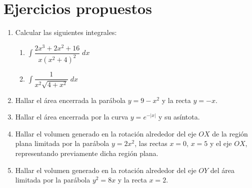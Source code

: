 \section{Ejercicios propuestos}
\begin{enumerate}[leftmargin=*]

\item Calcular las siguientes integrales:

\begin{enumerate}
\item $ \int{\dfrac{2x^{3}+2x^{2}+16}{x(x^{2}+4)^{2}}\;dx}$
\item $ \int{\dfrac{1}{x^{2}\sqrt{4+x^{2}}}\;dx}$
\end{enumerate}

\item Hallar el área encerrada la parábola $y=9-x^{2}$ y la recta $y=-x$.


\item Hallar el área encerrada por la curva $y=e^{-|x|}$ y su asíntota.


\item Hallar el volumen generado en la rotación alrededor del eje $OX$ de la región plana limitada por la parábola $y=2x^{2}$, las rectas $x=0$, $x=5$ y el eje $OX$, representando previamente dicha región plana.


\item Hallar el volumen generado en la rotación alrededor del eje $OY$ del área limitada por la parábola $y^{2}=8x$ y la recta $x=2$.

\end{enumerate}

\newpage
\mbox{}
